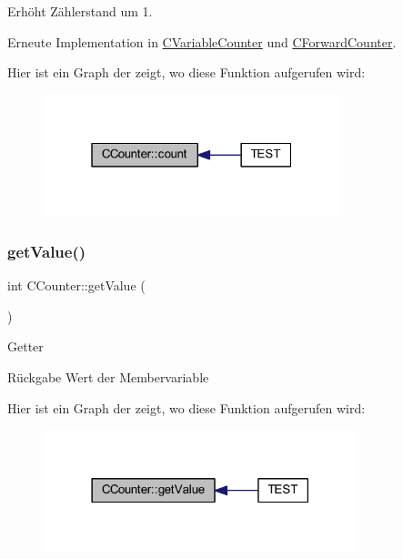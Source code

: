 Erhöht Zählerstand um 1. 



Erneute Implementation in \hyperlink{class_c_variable_counter_a693c27202acd18d53c4642ce642927bc}{C\+Variable\+Counter} und \hyperlink{class_c_forward_counter_afc451afa9f8b76f70b28c08982265a86}{C\+Forward\+Counter}.

Hier ist ein Graph der zeigt, wo diese Funktion aufgerufen wird\+:\nopagebreak
\begin{figure}[H]
\begin{center}
\leavevmode
\includegraphics[width=244pt]{class_c_counter_a90f3e164f3fc1dcf91044702d6940c4d_icgraph}
\end{center}
\end{figure}
\mbox{\label{class_c_counter_a2dbc787892c9458d50a4d5ef5dcfe526}} 
\subsubsection{\texorpdfstring{get\+Value()}{getValue()}}
{\footnotesize\ttfamily int C\+Counter\+::get\+Value (\begin{DoxyParamCaption}{ }\end{DoxyParamCaption})}

Getter \begin{DoxyReturn}{Rückgabe}
Wert der Membervariable 
\end{DoxyReturn}
Hier ist ein Graph der zeigt, wo diese Funktion aufgerufen wird\+:\nopagebreak
\begin{figure}[H]
\begin{center}
\leavevmode
\includegraphics[width=258pt]{class_c_counter_a2dbc787892c9458d50a4d5ef5dcfe526_icgraph}
\end{center}
\end{figure}
\mbox{\label{class_c_counter_ac41245afdd95c0149e99bad21696a372}} 
